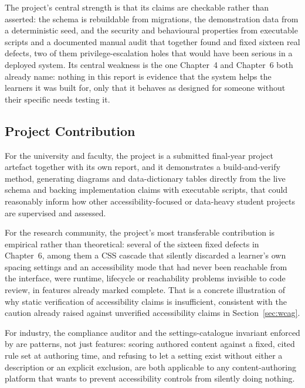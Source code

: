 \documentclass[12pt, oneside]{article} %
\newcommand{\tcode}[1]{\path{#1}}
\begin{document}
The project's central strength is that its claims are checkable rather than asserted: the schema is rebuildable from migrations, the demonstration data from a deterministic seed, and the security and behavioural properties from executable scripts and a documented manual audit that together found and fixed sixteen real defects, two of them privilege-escalation holes that would have been serious in a deployed system. Its central weakness is the one Chapter~4 and Chapter~6 both already name: nothing in this report is evidence that the system helps the learners it was built for, only that it behaves as designed for someone without their specific needs testing it.

\subsection{Project Contribution}

For the university and faculty, the project is a submitted final-year project artefact together with its own report, and it demonstrates a build-and-verify method, generating diagrams and data-dictionary tables directly from the live schema and backing implementation claims with executable scripts, that could reasonably inform how other accessibility-focused or data-heavy student projects are supervised and assessed.

For the research community, the project's most transferable contribution is empirical rather than theoretical: several of the sixteen fixed defects in Chapter~6, among them a CSS cascade that silently discarded a learner's own spacing settings and an accessibility mode that had never been reachable from the interface, were runtime, lifecycle or reachability problems invisible to code review, in features already marked complete. That is a concrete illustration of why static verification of accessibility claims is insufficient, consistent with the caution already raised against unverified accessibility claims in Section~\ref{sec:wcag}.

For industry, the compliance auditor and the settings-catalogue invariant enforced by \tcode{npm run test:a11y-catalog} are patterns, not just features: scoring authored content against a fixed, cited rule set at authoring time, and refusing to let a setting exist without either a description or an explicit exclusion, are both applicable to any content-authoring platform that wants to prevent accessibility controls from silently doing nothing.
\end{document}
